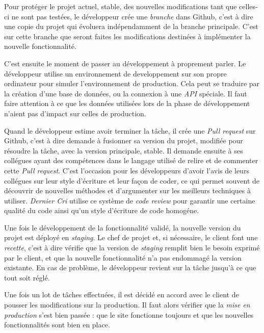 \documentclass[12pt,a4paper]{article}
\begin{document}
  \bigskip

  Pour protéger le projet actuel, stable, des nouvelles modifications tant
  que celles-ci ne sont pas testées, le développeur crée une
  \emph{branche} dans Github, c'est à dire une copie du projet qui
  évoluera indépendamment de la branche principale. C'est sur cette
  branche que seront faites les modifications destinées à implémenter la
  nouvelle fonctionnalité.

  \bigskip

  C'est ensuite le moment de passer au développement à proprement parler.
  Le développeur utilise un environnement de developpement sur son propre
  ordinateur pour simuler l'environnement de production. Cela peut se
  traduire par la création d'une base de données, ou la connexion à une
  \emph{API} spéciale. Il faut faire attention à ce que les données
  utilisées lors de la phase de développement n'aient pas d'impact sur
  celles de production.

  \bigskip

  Quand le développeur estime avoir terminer la tâche, il crée une
  \emph{Pull request} sur Github, c'est à dire demande à fusionner sa
  version du projet, modifiée pour résoudre la tâche, avec la version
  principale, stable. Il demande ensuite à ses collégues ayant des
  compétences dans le langage utilisé de relire et de commenter cette
  \emph{Pull request}. C'est l'occasion pour les développeurs d'avoir
  l'avis de leurs collégues sur leur style d'écriture et leur façon de
  coder, ce qui permet souvent de découvrir de nouvelles méthodes et
  d'argumenter sur les meilleurs techniques à utiliser. \emph{Dernier Cri}
  utilise ce système de \emph{code review} pour garantir une certaine
  qualité du code ainsi qu'un style d'écriture de code homogéne.

  \bigskip

  Une fois le développement de la fonctionnalité validé, la nouvelle
  version du projet est déployé en \emph{staging}. Le chef de projet et,
  si nécessaire, le client font une \emph{recette}, c'est à dire vérifie
  que la version de \emph{staging} remplit bien le besoin exprimé par le
  client, et que la nouvelle fonctionnalité n'a pas endommagé la version
  existante. En cas de problème, le développeur revient sur la tâche
  jusqu'à ce que tout soit réglé.

  \bigskip

  Une fois un lot de tâches effectuées, il est décidé en accord avec le
  client de pousser les modifications sur la production. Il faut alors
  vérifier que la \emph{mise en production} s'est bien passée : que le
  site fonctionne toujours et que les nouvelles fonctionnalités sont bien
  en place.
\end{document}
